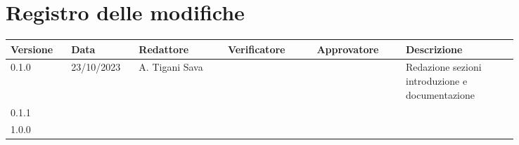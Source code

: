 \section{Registro delle modifiche}
{
\renewcommand{\arraystretch}{1.5}
\scriptsize
\begin{tabular}{p{0.10\linewidth}p{0.10\linewidth}p{0.15\linewidth}p{0.15\linewidth}p{0.15\linewidth}p{0.19\linewidth}}
    \textbf{Versione}   & \textbf{Data} & \textbf{Redattore}    & \textbf{Verificatore} & \textbf{Approvatore}  & \textbf{Descrizione}  \\
    \hline
    0.1.0               & 23/10/2023    & A. Tigani Sava        &                       &                       & Redazione sezioni introduzione e documentazione \\
    0.1.1               &               &                       &						&                       &	\\
    1.0.0 \\
    \hline
\end{tabular}
}